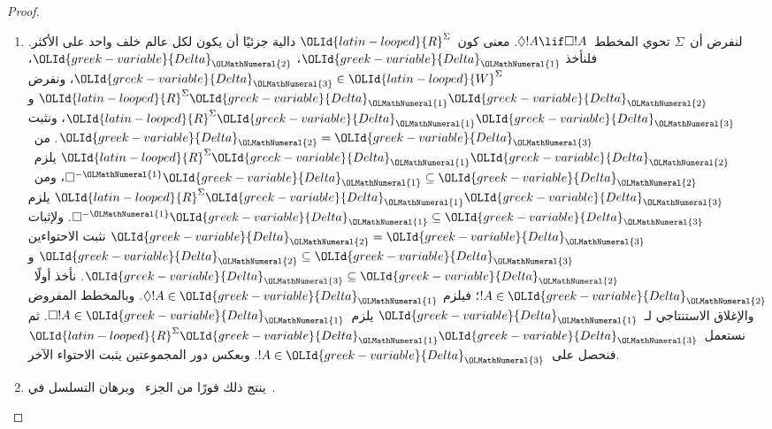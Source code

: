 \documentclass[../../../include/open-logic-section]{subfiles}
\begin{document}
\begin{proof}
  \begin{enumerate}
  \item لنفرض أن~$\Sigma$ تحوي المخطط~$\Diamond !A \lif \Box !A$.
    معنى كون~${\OLId{latin-looped}{R}}^\Sigma$ دالية جزئيًا أن يكون لكل عالم خلف واحد على الأكثر.
    فلنأخذ $ {\OLId{greek-variable}{Delta}}_{\OLMathNumeral{1}}$، ${\OLId{greek-variable}{Delta}}_{\OLMathNumeral{2}}$، ${\OLId{greek-variable}{Delta}}_{\OLMathNumeral{3}} \in {\OLId{latin-looped}{W}}^\Sigma$،
    ونفرض ${\OLId{latin-looped}{R}}^\Sigma {\OLId{greek-variable}{Delta}}_{\OLMathNumeral{1}}{\OLId{greek-variable}{Delta}}_{\OLMathNumeral{2}}$ و${\OLId{latin-looped}{R}}^\Sigma {\OLId{greek-variable}{Delta}}_{\OLMathNumeral{1}}{\OLId{greek-variable}{Delta}}_{\OLMathNumeral{3}}$،
    ونثبت $ {\OLId{greek-variable}{Delta}}_{\OLMathNumeral{2}} = {\OLId{greek-variable}{Delta}}_{\OLMathNumeral{3}}$.
    من~${\OLId{latin-looped}{R}}^\Sigma {\OLId{greek-variable}{Delta}}_{\OLMathNumeral{1}}{\OLId{greek-variable}{Delta}}_{\OLMathNumeral{2}}$ يلزم~$\Box^{-{\OLMathNumeral{1}}}{\OLId{greek-variable}{Delta}}_{\OLMathNumeral{1}} \subseteq {\OLId{greek-variable}{Delta}}_{\OLMathNumeral{2}}$،
    ومن~${\OLId{latin-looped}{R}}^\Sigma {\OLId{greek-variable}{Delta}}_{\OLMathNumeral{1}}{\OLId{greek-variable}{Delta}}_{\OLMathNumeral{3}}$ يلزم
    $\Box^{-{\OLMathNumeral{1}}}{\OLId{greek-variable}{Delta}}_{\OLMathNumeral{1}} \subseteq {\OLId{greek-variable}{Delta}}_{\OLMathNumeral{3}}$.
    ولإثبات $ {\OLId{greek-variable}{Delta}}_{\OLMathNumeral{2}} = {\OLId{greek-variable}{Delta}}_{\OLMathNumeral{3}}$ نثبت الاحتواءين
    ${\OLId{greek-variable}{Delta}}_{\OLMathNumeral{2}} \subseteq {\OLId{greek-variable}{Delta}}_{\OLMathNumeral{3}}$ و${\OLId{greek-variable}{Delta}}_{\OLMathNumeral{3}} \subseteq {\OLId{greek-variable}{Delta}}_{\OLMathNumeral{2}}$.
    نأخذ أولًا~$!A \in {\OLId{greek-variable}{Delta}}_{\OLMathNumeral{2}}$؛ فيلزم $\Diamond!A \in {\OLId{greek-variable}{Delta}}_{\OLMathNumeral{1}}$.
    وبالمخطط المفروض والإغلاق الاستنتاجي لـ~${\OLId{greek-variable}{Delta}}_{\OLMathNumeral{1}}$
    يلزم~$\Box!A \in {\OLId{greek-variable}{Delta}}_{\OLMathNumeral{1}}$.
    ثم نستعمل~${\OLId{latin-looped}{R}}^\Sigma {\OLId{greek-variable}{Delta}}_{\OLMathNumeral{1}}{\OLId{greek-variable}{Delta}}_{\OLMathNumeral{3}}$ فنحصل على~$!A \in {\OLId{greek-variable}{Delta}}_{\OLMathNumeral{3}}$.
    وبعكس دور المجموعتين يثبت الاحتواء الآخر.

  \item ينتج ذلك فورًا من الجزء~ وبرهان
    التسلسل في~.


\end{enumerate}
\end{proof}
\end{document}
